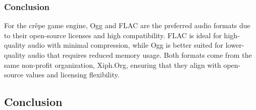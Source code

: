 \documentclass{projdoc}
\begin{document}
\subsubsection{Conclusion}

For the cr\^epe game engine, Ogg and FLAC are the preferred audio formats due to
their open-source licenses and high compatibility. FLAC is ideal for high-quality
audio with minimal compression, while Ogg is better suited for lower-quality audio
that requires reduced memory usage. Both formats come from the same non-profit
organization, Xiph.Org, ensuring that they align with open-source values and
licensing flexibility.

\subsection{Conclusion}

% 
% 
% 

% 
% 
% 
\end{document}
